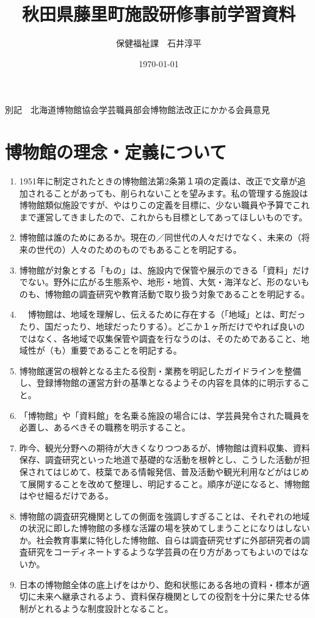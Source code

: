 \documentclass[12pt]{jsarticle}
\title{秋田県藤里町施設研修事前学習資料}%
\date{\today}
\author{保健福祉課　石井淳平}              %
\begin{document}
別記　北海道博物館協会学芸職員部会博物館法改正にかかる会員意見

\section{博物館の理念・定義について}
\begin{enumerate}
\item 1951年に制定されたときの博物館法第2条第１項の定義は、改正で文章が追加されることがあっても、削られないことを望みます。私の管理する施設は博物館類似施設ですが、やはりこの定義を目標に、少ない職員や予算でこれまで運営してきましたので、これからも目標としてあってほしいものです。
\item 博物館は誰のためにあるか。現在の／同世代の人々だけでなく、未来の（将来の世代の）人々のためのものでもあることを明記する。
\item 博物館が対象とする「もの」は、施設内で保管や展示のできる「資料」だけでない。野外に広がる生態系や、地形・地質、大気・海洋など、形のないものも、博物館の調査研究や教育活動で取り扱う対象であることを明記する。
\item　博物館は、地域を理解し、伝えるために存在する（「地域」とは、町だったり、国だったり、地球だったりする）。どこか１ヶ所だけでやれば良いのではなく、各地域で収集保管や調査を行なうのは、そのためであること、地域性が（も）重要であることを明記する。
\item 博物館運営の根幹となる主たる役割・業務を明記したガイドラインを整備し、登録博物館の運営方針の基準となるようその内容を具体的に明示すること。
\item 「博物館」や「資料館」を名乗る施設の場合には、学芸員発令された職員を必置し、あるべきその職務を明示すること。
\item 昨今、観光分野への期待が大きくなりつつあるが、博物館は資料収集、資料保存、調査研究といった地道で基礎的な活動を根幹とし、こうした活動が担保されてはじめて、枝葉である情報発信、普及活動や観光利用などがはじめて展開することを改めて整理し、明記すること。順序が逆になると、博物館はやせ細るだけである。
\item 博物館の調査研究機関としての側面を強調しすぎることは、それぞれの地域の状況に即した博物館の多様な活躍の場を狭めてしまうことになりはしないか。社会教育事業に特化した博物館、自らは調査研究せずに外部研究者の調査研究をコーディネートするような学芸員の在り方があってもよいのではないか。
\item 日本の博物館全体の底上げをはかり、飽和状態にある各地の資料・標本が適切に未来へ継承されるよう、資料保存機関としての役割を十分に果たせる体制がとれるような制度設計となること。

\end{enumerate}
\end{document}
